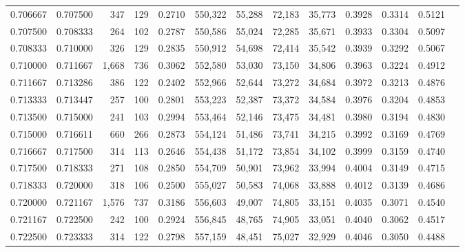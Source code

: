 \begin{tabular}{rrrrrrrrrrrrr}
0.706667 & 0.707500 &   347 & 129 &                                     0.2710 & 550,322 &  55,288 &  72,183 &  35,773 & 0.3928 & 0.3314 & 0.5121 \\
0.707500 & 0.708333 &   264 & 102 &                                     0.2787 & 550,586 &  55,024 &  72,285 &  35,671 & 0.3933 & 0.3304 & 0.5097 \\
0.708333 & 0.710000 &   326 & 129 &                                     0.2835 & 550,912 &  54,698 &  72,414 &  35,542 & 0.3939 & 0.3292 & 0.5067 \\
0.710000 & 0.711667 & 1,668 & 736 &                                     0.3062 & 552,580 &  53,030 &  73,150 &  34,806 & 0.3963 & 0.3224 & 0.4912 \\
0.711667 & 0.713286 &   386 & 122 &                                     0.2402 & 552,966 &  52,644 &  73,272 &  34,684 & 0.3972 & 0.3213 & 0.4876 \\
0.713333 & 0.713447 &   257 & 100 &                                     0.2801 & 553,223 &  52,387 &  73,372 &  34,584 & 0.3976 & 0.3204 & 0.4853 \\
0.713500 & 0.715000 &   241 & 103 &                                     0.2994 & 553,464 &  52,146 &  73,475 &  34,481 & 0.3980 & 0.3194 & 0.4830 \\
0.715000 & 0.716611 &   660 & 266 &                                     0.2873 & 554,124 &  51,486 &  73,741 &  34,215 & 0.3992 & 0.3169 & 0.4769 \\
0.716667 & 0.717500 &   314 & 113 &                                     0.2646 & 554,438 &  51,172 &  73,854 &  34,102 & 0.3999 & 0.3159 & 0.4740 \\
0.717500 & 0.718333 &   271 & 108 &                                     0.2850 & 554,709 &  50,901 &  73,962 &  33,994 & 0.4004 & 0.3149 & 0.4715 \\
0.718333 & 0.720000 &   318 & 106 &                                     0.2500 & 555,027 &  50,583 &  74,068 &  33,888 & 0.4012 & 0.3139 & 0.4686 \\
0.720000 & 0.721167 & 1,576 & 737 &                                     0.3186 & 556,603 &  49,007 &  74,805 &  33,151 & 0.4035 & 0.3071 & 0.4540 \\
0.721167 & 0.722500 &   242 & 100 &                                     0.2924 & 556,845 &  48,765 &  74,905 &  33,051 & 0.4040 & 0.3062 & 0.4517 \\
0.722500 & 0.723333 &   314 & 122 &                                     0.2798 & 557,159 &  48,451 &  75,027 &  32,929 & 0.4046 & 0.3050 & 0.4488 \\

\end{tabular}
